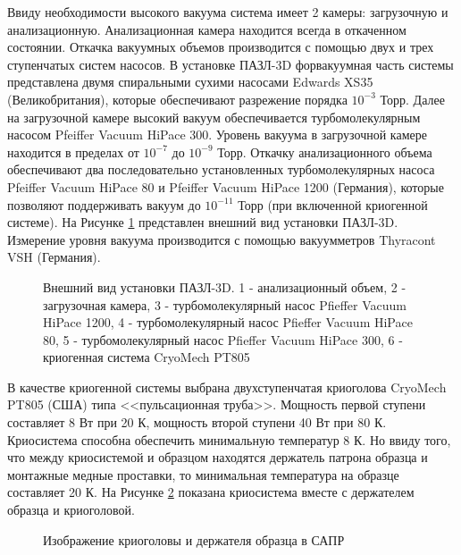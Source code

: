 Ввиду необходимости высокого вакуума система имеет 2 камеры: загрузочную и анализационную. Анализационная камера находится всегда в откаченном состоянии. Откачка вакуумных объемов производится с помощью двух и трех ступенчатых систем насосов. В установке ПАЗЛ-3D форвакуумная часть системы представлена двумя спиральными сухими насосами Edwards XS35 (Великобритания), которые обеспечивают разрежение порядка $10^{-3}$ Торр. Далее на загрузочной камере высокий вакуум обеспечивается турбомолекулярным насосом Pfeiffer Vacuum HiPace 300. Уровень вакуума в загрузочной камере находится в пределах от $10^{-7}$ до $10^{-9}$ Торр. Откачку анализационного объема обеспечивают два последовательно установленных турбомолекулярных насоса Pfeiffer Vacuum HiPace 80 и Pfeiffer Vacuum HiPace 1200 (Германия), которые позволяют поддерживать вакуум до $10^{-11}$ Торр (при включенной криогенной системе). На Рисунке \cref{fig:APPLE_foto_main} представлен внешний вид установки ПАЗЛ-3D. Измерение уровня вакуума производится с помощью вакуумметров Thyracont VSH (Германия).

\begin{figure}[htb]
	\caption{Внешний вид установки ПАЗЛ-3D. 1 - анализационный объем, 2 - загрузочная камера, 3 - турбомолекулярный насос Pfieffer Vacuum HiPace 1200, 4 - турбомолекулярный насос Pfieffer Vacuum HiPace 80, 5 - турбомолекулярный насос Pfieffer Vacuum HiPace 300, 6 - криогенная система CryoMech PT805}
	\label{fig:APPLE_foto_main}
\end{figure}

\FloatBarrier
В качестве криогенной системы выбрана двухступенчатая криоголова CryoMech PT805 (США) типа <<пульсационная труба>>. Мощность первой ступени составляет 8 Вт при 20 К, мощность второй ступени 40 Вт при 80 К. Криосистема способна обеспечить минимальную температур 8 К. Но ввиду того, что между криосистемой и образцом находятся держатель патрона образца и монтажные медные проставки, то минимальная температура на образце составляет 20 К. На Рисунке \cref{fig:APPLE_cryosystem} показана криосистема вместе с держателем образца и криоголовой.

\begin{figure}[htb]
	\caption{Изображение криоголовы и держателя образца в САПР}
	\label{fig:APPLE_cryosystem}
\end{figure}

\FloatBarrier

